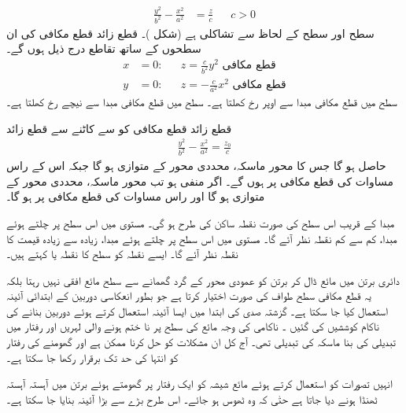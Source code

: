 \begin{align}\label{مساوات_سمتیہ_قطع_زائد_قطع_مکافی_الف}
\frac{y^2}{b^2}-\frac{x^2}{a^2}&=\frac{z}{c}&& c>0
\end{align}
سطح  اور سطح  کے لحاظ سے تشاکلی ہے (شکل )۔ قطع زائد قطع مکافی کی ان سطحوں کے ساتھ تقاطع درج ذیل ہوں گے۔
\begin{align}
x&=0:&&z=\frac{c}{b^2}y^2\,\,\text{قطع مکافی}\label{مساوات_سمتیہ_قطع_زائد_قطع_مکافی_ب}\\
y&=0:&&z=-\frac{c}{a^2}x^2\,\,\text{قطع مکافی}\label{مساوات_سمتیہ_قطع_زائد_قطع_مکافی_پ}
\end{align}
سطح  میں  قطع مکافی مبدا سے اوپر رخ  کھلتا ہے۔  سطح  میں قطع مکافی مبدا سے نیچے رخ کھلتا ہے۔

قطع زائد قطع مکافی کو   سے   کاٹنے سے قطع زائد
\begin{align*}
\frac{y^2}{b^2}-\frac{x^2}{a^2}=\frac{z_0}{c}
\end{align*}
حاصل ہو گا جس کا محور ماسکہ،  محددی  محور  کے متوازی ہو گا  جبکہ اس کے راس  مساوات  کی قطع مکافی پر ہوں  گے۔ اگر  منفی ہو تب محور ماسکہ، محددی  محور  کے متوازی ہو گا اور راس مساوات  کی قطع مکافی پر ہو گا۔

مبدا کے قریب اس سطح کی صورت نقطہ ساکن      کی طرح ہو گی۔ مستوی  میں اس سطح پر چلتے ہوئے مبدا،  کم سے کم نقطہ نظر آئے گا۔ مستوی  میں اس سطح پر چلتے ہوئے  مبدا،  زیادہ سے زیادہ قیمت کا نقطہ نظر آئے گا۔  ایسے نقطہ کو   سطح کا  نقطہ یا کہتے ہیں۔

دائری برتن میں مائع ڈال کر برتن کو عمودی محور کے گرد گھمانے  سے سطح مائع افقی نہیں رہتا بلکہ یہ قطع مکافی سطح طواف   کی صورت اختیار کرتا ہے جو   بطور انعکاسی دوربین  کے ابتدائی آئینہ استعمال کیا جا سکتا ہے۔   گزشتہ صدی کی ابتدا میں  ایسا آئینہ استعمال کرتے ہوئے دوربین بنانے کی ناکام  کوششیں کی گئیں ۔ ناکامی کی وجہ  مائع کی سطح پر  نا ختم ہونے والی لہریں  اور رفتار میں تبدیلی کی بنا ماسکہ کی تبدیلی تھی۔ آج کل ان مشکلات کو حل کرنا ممکن ہے اور گھومنے کی رفتار کو انتہا کی حد تک برقرار رکھا جا سکتا ہے۔

انہیں تصورات کو استعمال کرتے ہوئے  مائع شیشہ  کو ایک رفتار پر گھومتے ہوئے  برتن میں آہستہ آہستہ ٹھنڈا ہونے دیا جاتا ہے حتٰی کہ وہ ٹھوس ہو جائے۔ اس طرح بڑے سے بڑا آئینہ بنایا جا سکتا ہے۔


